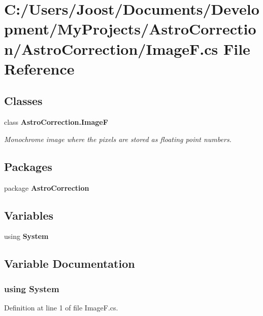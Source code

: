 \section{C:/Users/Joost/Documents/Development/MyProjects/AstroCorrection/AstroCorrection/ImageF.cs File Reference}
\label{_image_f_8cs}
\subsection*{Classes}
\begin{DoxyCompactItemize}
\item 
class {\bf AstroCorrection.ImageF}
\begin{DoxyCompactList}\small\item\em Monochrome image where the pixels are stored as floating point numbers. \item\end{DoxyCompactList}\end{DoxyCompactItemize}
\subsection*{Packages}
\begin{DoxyCompactItemize}
\item 
package {\bf AstroCorrection}
\end{DoxyCompactItemize}
\subsection*{Variables}
\begin{DoxyCompactItemize}
\item 
﻿using {\bf System}
\end{DoxyCompactItemize}


\subsection{Variable Documentation}
\subsubsection[{System}]{\setlength{\rightskip}{0pt plus 5cm}﻿using {\bf System}}\label{_image_f_8cs_a81a223a02c34d82b47199f08308847f2}


Definition at line 1 of file ImageF.cs.